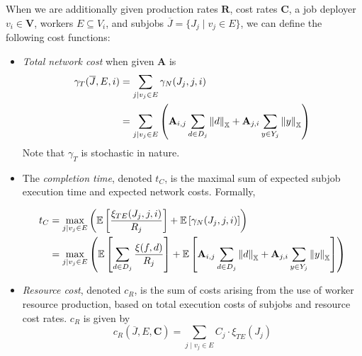 \documentclass[../mthe-493-project-proposal.tex]{subfiles}
\begin{document}
    When we are additionally given production rates $\mathbf{R}$, cost rates $\mathbf{C}$, a job deployer $v_i \in \mathbf{V}$, workers $E \subseteq V_i$, and subjobs $\overline{J} = \{J_j \mid v_j \in E\}$, we can define the following cost functions:
    
    \begin{itemize}
        \item \textit{Total network cost} when given $\mathbf{A}$ is
            \begin{align*}
                \gamma_T(\overline{J}, E, i) &= \sum_{j \mid v_j \in E} \gamma_N(J_j, j, i) \\
                &= \sum_{j \mid v_j \in E} \left(
                    \mathbf{A}_{i,j} \sum\limits_{d \in D_j} \norm{d}_{\mathbb{X}} + \mathbf{A}_{j,i} \sum\limits_{y \in Y_j} \norm{y}_{\mathbb{X}}
                \right)
            \end{align*}
            Note that $\gamma_T$ is stochastic in nature.
            
        \item The \textit{completion time}, denoted $t_C$, is the maximal sum of expected subjob execution time and expected network costs. Formally,
    
            \begin{align*}
                t_C &= \max_{j \mid v_j \in E}
                \left(
                    \mathbb{E}\left[ \frac{\xi_{TE}(J_j, j, i)}{R_j} \right]
                    + \mathbb{E}\left[ \gamma_N(J_j, j, i) \right]
                \right) \\
                &= \max_{j \mid v_j \in E}
                \left(
                    \mathbb{E}\left[ \sum\limits_{d \in D_j} \frac{\xi(f, d)}{R_j}\right]
                    + \mathbb{E}\left[ 
                    \mathbf{A}_{i,j} \sum\limits_{d \in D_j} \norm{d}_{\mathbb{X}} + \mathbf{A}_{j,i} \sum\limits_{y \in Y_j} \norm{y}_{\mathbb{X}}
                    \right]
                \right)
            \end{align*}
            
        \item \textit{Resource cost}, denoted $c_R$, is the sum of costs arising from the use of worker resource production, based on total execution costs of subjobs and resource cost rates. $c_R$ is given by
            \begin{equation*}
                c_R(\overline{J}, E, \mathbf{C}) = \sum_{j \mid v_j \in E} C_j \cdot \xi_{TE}(J_j)
            \end{equation*}
    \end{itemize}
    
\end{document}
